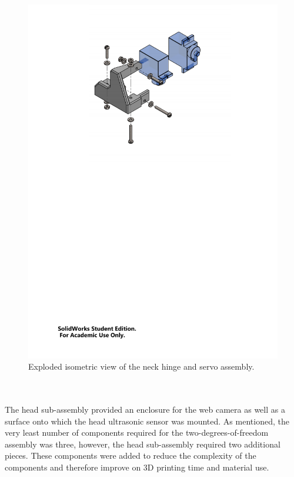         \begin{figure}[h!]
          \centering
          \includegraphics[clip, trim=3cm 17cm 3cm 1cm, width=1\linewidth]{figures/neck-hinge-servo-sub-expl}
          \caption[Exploded isometric view of the neck hinge and servo assembly.]{Exploded isometric view of the neck hinge and servo assembly.}
          \label{fig:mechDesign-neckHingeServoSubExpl}
        \end{figure}

      \\\\
        The head sub-assembly provided an enclosure for the web camera as well as a surface onto which the head ultrasonic sensor was mounted. As mentioned, the very least number of components required for the two-degrees-of-freedom assembly was three, however, the head sub-assembly required two additional pieces. These components were added to reduce the complexity of the components and therefore improve on 3D printing time and material use.
        
